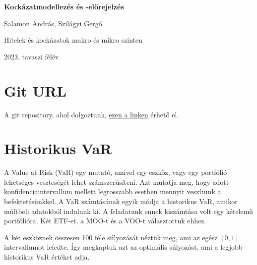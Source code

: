 \documentclass[12pt]{article}
\begin{document}
\begin{titlepage}
	\begin{center}
		\vspace*{5cm}
		
		\Huge
		\textbf{Kockázatmodellezés és -előrejelzés}
		
		\vspace{2cm}
		
		\LARGE
		Salamon András, Szilágyi Gergő
		
		\vfill
		
		\Large
		Hitelek és kockázatok makro és mikro szinten \\

        \vspace{1cm}
        
        2023. tavaszi félév
            
    \end{center}
\end{titlepage}


\tableofcontents

\clearpage

\listoffigures

\clearpage

\section*{Git URL}

A git repository, ahol dolgoztunk, \href{https://github.com/MaboSzate/beadando_SA_SzG}{ezen a linken} érhető el.

\section{Historikus VaR}

A Value at Risk (VaR) egy mutató, amivel egy eszköz, vagy egy portfólió lehetséges veszteségét lehet számszerűsíteni. Azt mutatja meg, hogy adott konfidenciaintervallum mellett legrosszabb esetben mennyit veszítünk a befektetésünkkel. A VaR számtásának egyik módja a historikus VaR, amikor múltbeli adatokból indulunk ki. A feladatunk ennek kiszámtása volt egy kételemű portfólióra. Két ETF-et, a MOO-t és a VOO-t választottuk ehhez.

A két eszköznek összesen 100 féle súlyozását néztük meg, ami az egész $[0,1]$ intervallumot lefedte. Így megkaptuk azt az optimális súlyozást, ami a legjobb historikus VaR értéket adja.
\end{document}
